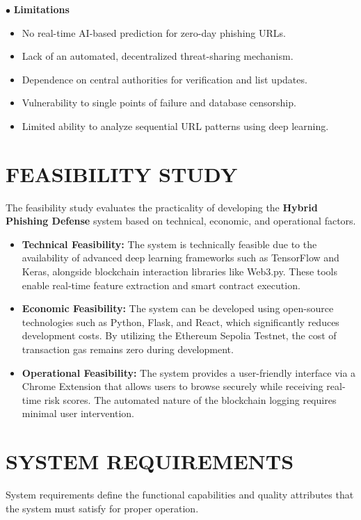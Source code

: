 \noindent $\bullet$ \textbf{Limitations}

\begin{itemize}[label=*]
\item No real-time AI-based prediction for zero-day phishing URLs.
\item Lack of an automated, decentralized threat-sharing mechanism.
\item Dependence on central authorities for verification and list updates.
\item Vulnerability to single points of failure and database censorship.
\item Limited ability to analyze sequential URL patterns using deep learning.
\end{itemize}

\section{FEASIBILITY STUDY}

The feasibility study evaluates the practicality of developing the \textbf{Hybrid Phishing Defense} system based on technical, economic, and operational factors.

\begin{itemize}
\item \textbf{Technical Feasibility:} The system is technically feasible due to the availability of advanced deep learning frameworks such as TensorFlow and Keras, alongside blockchain interaction libraries like Web3.py. These tools enable real-time feature extraction and smart contract execution. 
\item \textbf{Economic Feasibility:} The system can be developed using open-source technologies such as Python, Flask, and React, which significantly reduces development costs. By utilizing the Ethereum Sepolia Testnet, the cost of transaction gas remains zero during development.
\item \textbf{Operational Feasibility:} The system provides a user-friendly interface via a Chrome Extension that allows users to browse securely while receiving real-time risk scores. The automated nature of the blockchain logging requires minimal user intervention.
\end{itemize}

\section{SYSTEM REQUIREMENTS}

System requirements define the functional capabilities and quality attributes that the system must satisfy for proper operation.

